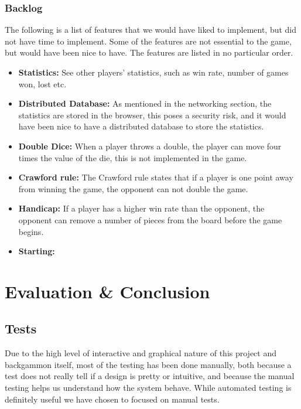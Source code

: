 \documentclass[ twoside,openright,titlepage,numbers=noenddot,headinclude,%
                footinclude=true,cleardoublepage=empty,abstractoff, %
                BCOR=5mm,paper=a4,fontsize=11pt,%
                ngerman,american,%
                ]{scrreprt}
\begin{document}
\subsection{Backlog}
The following is a list of features that we would have liked to implement, but did not have time to implement. Some of the features are not essential to the game, but would have been nice to have. The features are listed in no particular order.
\begin{itemize}
  \item \textbf{Statistics:} See other players' statistics, such as win rate, number of games won, lost etc. 
  \item \textbf{Distributed Database:} As mentioned in the networking section, the statistics are stored in the browser, this poses a security risk, and it would have been nice to have a distributed database to store the statistics.
  \item \textbf{Double Dice:} When a player throws a double, the player can move four times the value of the die, this is not implemented in the game.
  \item \textbf{Crawford rule:} The Crawford rule states that if a player is one point away from winning the game, the opponent can not double the game. 
  \item \textbf{Handicap:} If a player has a higher win rate than the opponent, the opponent can remove a number of pieces from the board before the game begins.
  \item \textbf{Starting:}
\end{itemize}




\chapter{Evaluation \& Conclusion}
\label{cha:evaluation}

\section{Tests}
Due to the high level of interactive and graphical nature of this project and backgammon itself, most of the testing has been done manually, both because a test does not really tell if a design is pretty or intuitive, and because the manual testing helps us understand how the system behave. While automated testing is definitely useful we have chosen to focused on manual tests. 
\end{document}
